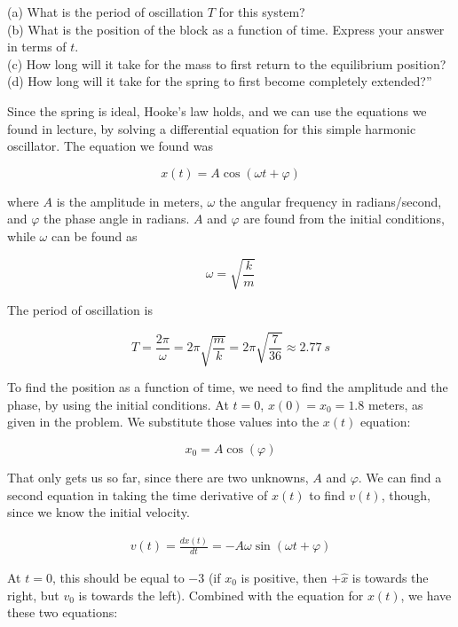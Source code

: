 \documentclass[12pt,a4paper]{report}
\begin{document}
(a) What is the period of oscillation $T$ for this system?\\
(b) What is the position of the block as a function of time. Express your answer in terms of $t$.\\
(c) How long will it take for the mass to first return to the equilibrium position?\\
(d) How long will it take for the spring to first become completely extended?''

Since the spring is ideal, Hooke's law holds, and we can use the equations we found in lecture, by solving a differential equation for this simple harmonic oscillator. The equation we found was

\begin{equation}
x(t) = A \cos(\omega t + \varphi)
\end{equation}

where $A$ is the amplitude in meters, $\omega$ the angular frequency in radians/second, and $\varphi$ the phase angle in radians. $A$ and $\varphi$ are found from the initial conditions, while $\omega$ can be found as

\begin{equation}
\omega = \sqrt{\frac{k}{m}}
\end{equation}

The period of oscillation is

\begin{equation}
T = \frac{2 \pi}{\omega} = 2 \pi\sqrt{\frac{m}{k}} = 2 \pi \sqrt{\frac{7}{36}} \approx \SI{2.77}{s}
\end{equation}

To find the position as a function of time, we need to find the amplitude and the phase, by using the initial conditions. At $t = 0$, $x(0) = x_0 = 1.8$ meters, as given in the problem. We substitute those values into the $x(t)$ equation:

\begin{equation}
x_0 = A \cos(\varphi)
\end{equation}

That only gets us so far, since there are two unknowns, $A$ and $\varphi$. We can find a second equation in taking the time derivative of $x(t)$ to find $v(t)$, though, since we know the initial velocity.

\begin{align}
v(t) = \frac{dx(t)}{dt} = -A \omega \sin(\omega t + \varphi)
\end{align}

At $t = 0$, this should be equal to $-3$ (if $x_0$ is positive, then $+\hat{x}$ is towards the right, but $v_0$ is towards the left). Combined with the equation for $x(t)$, we have these two equations:
\end{document}
